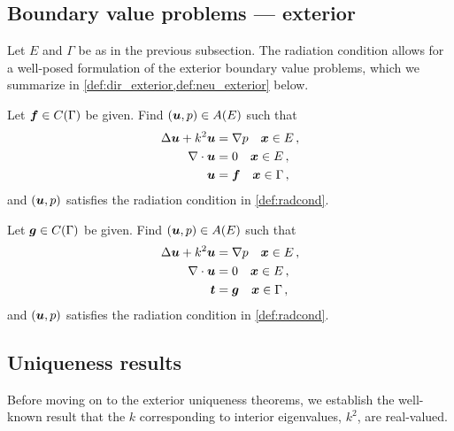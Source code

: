 \subsection{Boundary value problems --- exterior}

Let $E$ and $\Gamma$ be as in the previous subsection.
The radiation condition allows for a well-posed formulation
of the exterior boundary value problems, which we
summarize in
\cref{def:dir_exterior,def:neu_exterior} below.

\begin{definition}
  \label{def:dir_exterior}
  Let ${\boldsymbol f} \in C(\Gamma)$ be given. Find $({\boldsymbol u},p) \in A(E)$
  such that
  \begin{equation}
  \begin{aligned} \label{eq:dir_exterior}
    \Delta {\boldsymbol u} + k^{2} {\boldsymbol u} &= \nabla p \quad {\boldsymbol x} \in E \, ,\\
    \nabla \cdot {\boldsymbol u} &= 0 \quad {\boldsymbol x} \in E \, ,  \\
    {\boldsymbol u} &= {\boldsymbol f} \quad {\boldsymbol x} \in \Gamma \, , 
  \end{aligned}
  \end{equation}
  and $({\boldsymbol u},p)$ satisfies the radiation condition in
  \cref{def:radcond}.
\end{definition}
\begin{definition}
  \label{def:neu_exterior}  
  Let ${\boldsymbol g} \in C(\Gamma)$ be given. Find $({\boldsymbol u},p) \in A(E)$
  such that
  \begin{equation}
  \begin{aligned} \label{eq:neu_exterior}
    \Delta {\boldsymbol u} + k^{2} {\boldsymbol u} &= \nabla p \quad {\boldsymbol x} \in E \, ,\\
    \nabla \cdot {\boldsymbol u} &= 0 \quad {\boldsymbol x} \in E \, ,  \\
    {\boldsymbol t} &= {\boldsymbol g} \quad {\boldsymbol x} \in \Gamma \, ,
  \end{aligned}
  \end{equation}
  and $({\boldsymbol u},p)$ satisfies the radiation condition in
  \cref{def:radcond}.
\end{definition}



\subsection{Uniqueness results}

Before moving on to the exterior uniqueness theorems,
we establish the well-known result that
the $k$ corresponding to interior eigenvalues, $k^2$,
are real-valued.

